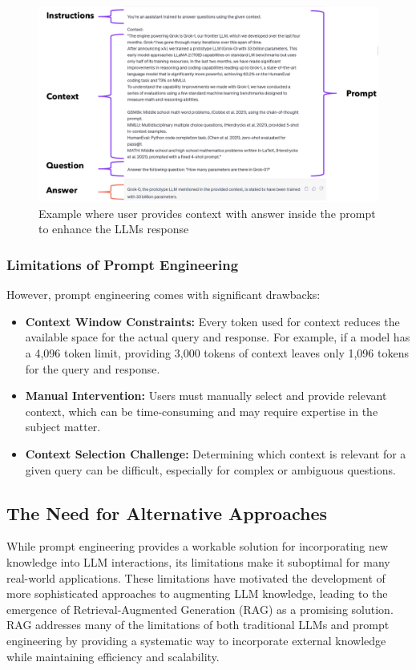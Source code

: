 \documentclass[12pt]{article}
\begin{document}
    \begin{figure}[h!]
        \centering
        \includegraphics[width=1.0\textwidth]{prompt_engineering.png}
        \caption{Example where user provides context with answer inside the prompt to enhance the LLMs response \cite{prompt_engineering}}
        \label{fig:visual_cortex}
    \end{figure}

    \subsubsection{Limitations of Prompt Engineering}
    
    However, prompt engineering comes with significant drawbacks:
    \begin{itemize}
    \item \textbf{Context Window Constraints:} Every token used for context reduces the 
    available space for the actual query and response. For example, if a model has a 4,096 
    token limit, providing 3,000 tokens of context leaves only 1,096 tokens for the query and response.
    
    \item \textbf{Manual Intervention:} Users must manually select and provide relevant context, 
    which can be time-consuming and may require expertise in the subject matter.
        
    \item \textbf{Context Selection Challenge:} Determining which context is relevant for a 
    given query can be difficult, especially for complex or ambiguous questions.    
    \end{itemize}

    \newpage
    \subsection{The Need for Alternative Approaches}
    While prompt engineering provides a workable solution for incorporating new knowledge 
    into LLM interactions, its limitations make it suboptimal for many real-world applications.
    These limitations have motivated the development of more sophisticated approaches to 
    augmenting LLM knowledge, leading to the emergence of Retrieval-Augmented Generation (RAG) 
    as a promising solution. RAG addresses many of the limitations of both traditional LLMs 
    and prompt engineering by providing a systematic way to incorporate external knowledge while 
    maintaining efficiency and scalability.
\end{document}
